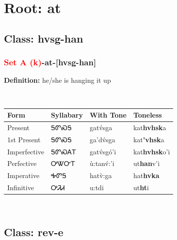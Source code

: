 \needspace{4in}
\section*{Root: at}
\nopagebreak
{}
\needspace{3in}
\subsection*{Class: hvsg-han}
\nopagebreak
\needspace{2in}
\subsubsection*{\textcolor{Red}{Set A (k)}{-}\textbf{at}{-}[hvsg-han]}
\nopagebreak
\textbf{Definition: } he/she is hanging it up
\\[0.5em]
\begin{tabularx}{\textwidth}{l X X X}%
\toprule%
\textbf{Form}&\textbf{Syllabary}&\textbf{With Tone}&\textbf{Toneless}\\%
\midrule%
Present&ᎦᏛᏍᎦ&gatv́sga&kat\textbf{hvhsk}a\\%
1st Present&ᎦᏛᏍᎦ&ga’dv́sga&kat\textbf{'vhsk}a\\%
Imperfective&ᎦᏛᏍᎪᎢ&gatv́sgó’i&kat\textbf{hvhsk}o'i\\%
Perfective&ᎤᏔᏅᎢ&ù:tanv́:’i&ut\textbf{han}v'i\\%
Imperative&ᎭᏛᎦ&hatv̀:ga&hat\textbf{hvka}\\%
Infinitive&ᎤᏘᏗ&u:tdi&ut\textbf{ht}i\\%
\bottomrule%
\end{tabularx}
\\[1em]
\needspace{3in}
\subsection*{Class: rev-e}
\nopagebreak
\needspace{2in}
